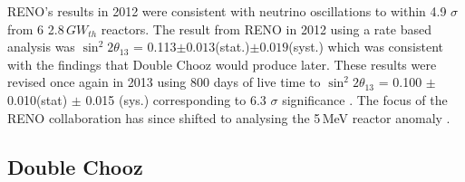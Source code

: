 \begin{figure}[!h]
\begin{minipage}{.45\textwidth}
  \label{fig:RENO_Spectrum}
\end{minipage}
\end{figure}

RENO's results in 2012 were consistent with neutrino oscillations to within 4.9 $\sigma$ from 6 2.8\,$GW_{th}$ reactors. The result from RENO in 2012 using a rate based analysis was $\sin^2{2\theta_{13}}$ = 0.113$\pm0.013$(stat.)$\pm0.019$(syst.) which was consistent with the findings that Double Chooz would produce later. These results were revised once again in 2013 using 800 days of live time to $\sin^2{2\theta_{13}}$ = 0.100 $\pm$ 0.010(stat) $\pm$ 0.015 (sys.) corresponding to 6.3 $\sigma$ significance \cite{reno2013}. The focus of the RENO collaboration has since shifted to analysing the 5\,MeV reactor anomaly \cite{reno_may_2019}. 

\subsection{Double Chooz}

